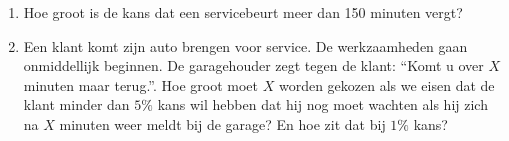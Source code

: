 
\begin{enumerate}[label=(\alph*)]
    \item Hoe groot is de kans dat een servicebeurt meer dan 150 minuten vergt?
    \answer{

    }

    \item Een klant komt zijn auto brengen voor service.
    De werkzaamheden gaan onmiddellijk beginnen.
    De garagehouder zegt tegen de klant: ``Komt u over $X$ minuten maar terug.''.
    Hoe groot moet $X$ worden gekozen als we eisen dat de klant minder dan $5\%$ kans wil hebben dat hij nog moet wachten als hij zich na $X$ minuten weer meldt bij de garage?
    En hoe zit dat bij $1\%$ kans?
    \answer{

    }
\end{enumerate}
